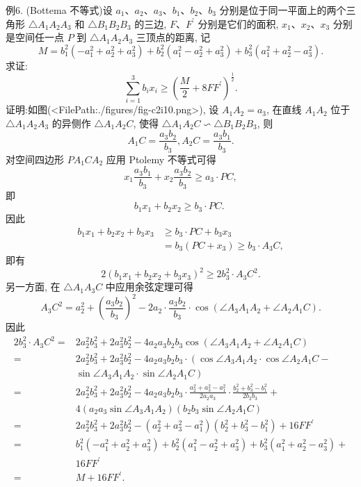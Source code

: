例6. (Bottema 不等式)设 $a_1 、 a_2 、 a_3 、 b_1 、 b_2 、 b_3$ 分别是位于同一平面上的两个三角形 $\triangle A_1 A_2 A_3$ 和 $\triangle B_1 B_2 B_3$ 的三边, $F 、 F^{\prime}$ 分别是它们的面积, $x_1 、 x_2 、 x_3$ 分别是空间任一点 $P$ 到 $\triangle A_1 A_2 A_3$ 三顶点的距离, 记
$$
M=b_1^2\left(-a_1^2+a_2^2+a_3^2\right)+b_2^2\left(a_1^2-a_2^2+a_3^2\right)+b_3^2\left(a_1^2+a_2^2-a_3^2\right) .
$$
求证:
$$
\sum_{i=1}^3 b_i x_i \geqslant\left(\frac{M}{2}+8 F F^{\prime}\right)^{\frac{1}{2}} . \label{eq1}
$$
证明:如图(<FilePath:./figures/fig-c2i10.png>), 设 $A_1 A_2=a_3$, 在直线 $A_1 A_2$ 位于 $\triangle A_1 A_2 A_3$ 的异侧作 $\triangle A_1 A_2 C$, 使得 $\triangle A_1 A_2 C \backsim \triangle B_1 B_2 B_3$, 则
$$
A_1 C=\frac{a_3 b_2}{b_3}, A_2 C=\frac{a_3 b_1}{b_3} .
$$
对空间四边形 $P A_1 C A_2$ 应用 Ptolemy 不等式可得
$$
x_1 \frac{a_3 b_1}{b_3}+x_2 \frac{a_3 b_2}{b_3} \geqslant a_3 \cdot P C,
$$
即
$$
b_1 x_1+b_2 x_2 \geqslant b_3 \cdot P C \text {. }
$$
因此
$$
\begin{aligned}
b_1 x_1+b_2 x_2+b_3 x_3 & \geqslant b_3 \cdot P C+b_3 x_3 \\
& =b_3\left(P C+x_3\right) \geqslant b_3 \cdot A_3 C,
\end{aligned}
$$
即有
$$
2\left(b_1 x_1+b_2 x_2+b_3 x_3\right)^2 \geqslant 2 b_3^2 \cdot A_3 C^2 . \label{eq2}
$$
另一方面, 在 $\triangle A_1 A_3 C$ 中应用余弦定理可得
$$
A_3 C^2=a_2^2+\left(\frac{a_3 b_2}{b_3}\right)^2-2 a_2 \cdot \frac{a_3 b_2}{b_3} \cdot \cos \left(\angle A_3 A_1 A_2+\angle A_2 A_1 C\right) .
$$
因此
$$
\begin{aligned}
2 b_3^2 \cdot A_3 C^2= & 2 a_2^2 b_3^2+2 a_3^2 b_2^2-4 a_2 a_3 b_2 b_3 \cos \left(\angle A_3 A_1 A_2+\angle A_2 A_1 C\right) \\
= & 2 a_2^2 b_3^2+2 a_3^2 b_2^2-4 a_2 a_3 b_2 b_3 \cdot\left(\cos \angle A_3 A_1 A_2 \cdot \cos \angle A_2 A_1 C-\right. \\
& \left.\sin \angle A_3 A_1 A_2 \cdot \sin \angle A_2 A_1 C\right) \\
= & 2 a_2^2 b_3^2+2 a_3^2 b_2^2-4 a_2 a_3 b_2 b_3 \cdot \frac{a_2^2+a_3^2-a_1^2}{2 a_2 a_3} \cdot \frac{b_2^2+b_3^2-b_1^2}{2 b_2 b_3}+ \\
& 4\left(a_2 a_3 \sin \angle A_3 A_1 A_2\right)\left(b_2 b_3 \sin \angle A_2 A_1 C\right) \\
= & 2 a_2^2 b_3^2+2 a_3^2 b_2^2-\left(a_2^2+a_3^2-a_1^2\right)\left(b_2^2+b_3^2-b_1^2\right)+16 F F^{\prime} \\
= & b_1^2\left(-a_1^2+a_2^2+a_3^2\right)+b_2^2\left(a_1^2-a_2^2+a_3^2\right)+b_3^2\left(a_1^2+a_2^2-a_3^2\right)+ \\
& 16 F F^{\prime} \\
= & M+16 F F^{\prime} . \label{eq3}
\end{aligned}
$$
